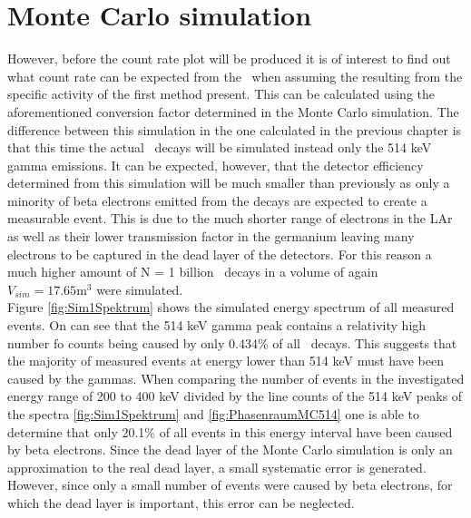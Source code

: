 \documentclass[encoding=utf8,british]{tumphthesis}
\begin{document}
\section{Monte Carlo simulation}

However, before the count rate plot will be produced it is of interest to find out what count rate can be expected from the \Kr\ when assuming the resulting from the specific activity of the first method present.
This can be calculated using the aforementioned conversion factor determined in the Monte Carlo simulation.
The difference between this simulation in the one calculated in the previous chapter is that this time the actual \Kr\ decays will be simulated instead only the 514 keV gamma emissions.
It can be expected, however, that the detector efficiency determined from this simulation will be much smaller than previously as only a minority of beta electrons emitted from the decays are expected to create a measurable event.
This is due to the much shorter range of electrons in the LAr as well as their lower transmission factor in the germanium leaving many electrons to be captured in the dead layer of the detectors.
For this reason a much higher amount of N = 1 billion \Kr\ decays in a volume of again $V_{sim} = 17.65 \mathrm{m}^3$ were simulated.
\\

Figure \ref{fig:Sim1Spektrum} shows the simulated energy spectrum of all measured events.
On can see that the 514 keV gamma peak contains a relativity high number fo counts being caused by only 0.434$\%$ of all \Kr\ decays.
This suggests that the majority of measured events at energy lower than 514 keV must have been caused by the gammas.
When comparing the number of events in the investigated energy range of 200 to 400 keV divided by the line counts of the 514 keV peaks of the spectra \ref{fig:Sim1Spektrum} and \ref{fig:PhasenraumMC514} one is able to determine that only 20.1$\%$ of all events in this energy interval have been caused by beta electrons.
Since the dead layer of the Monte Carlo simulation is only an approximation to the real dead layer, a small systematic error is generated. 
However, since only a small number of events were caused by beta electrons, for which the dead layer is important, this error can be neglected. 
\\
\end{document}
